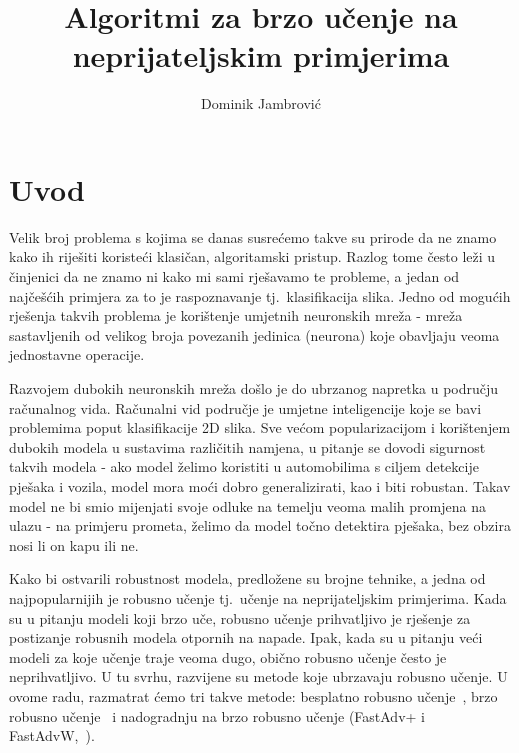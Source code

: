\documentclass[times, utf8, zavrsni, numeric]{fer}
\begin{document}

\title{Algoritmi za brzo učenje na neprijateljskim primjerima}

\author{Dominik Jambrović}

\maketitle

% 


\tableofcontents

\chapter{Uvod}
Velik broj problema s kojima se danas susrećemo takve su prirode da ne znamo kako ih riješiti koristeći klasičan, algoritamski pristup. Razlog tome često leži u činjenici da ne znamo ni kako mi sami rješavamo te probleme, 
a jedan od najčešćih primjera za to je raspoznavanje tj.\ klasifikacija slika.
Jedno od mogućih rješenja takvih problema je korištenje umjetnih neuronskih mreža - mreža sastavljenih od velikog broja povezanih jedinica (neurona) koje obavljaju veoma jednostavne operacije.

Razvojem dubokih neuronskih mreža došlo je do ubrzanog napretka u području računalnog vida. Računalni vid područje je umjetne inteligencije koje se bavi problemima poput klasifikacije 2D slika. 
Sve većom popularizacijom i korištenjem dubokih modela u sustavima različitih namjena, u pitanje se dovodi sigurnost takvih modela -
ako model želimo koristiti u automobilima s ciljem detekcije pješaka i vozila, model mora moći dobro generalizirati, kao i biti robustan. Takav model ne bi smio mijenjati svoje odluke na temelju veoma malih promjena na ulazu -
na primjeru prometa, želimo da model točno detektira pješaka, bez obzira nosi li on kapu ili ne.

Kako bi ostvarili robustnost modela, predložene su brojne tehnike, a jedna od najpopularnijih je robusno učenje tj.\ učenje na neprijateljskim primjerima. 
Kada su u pitanju modeli koji brzo uče, robusno učenje prihvatljivo je rješenje za postizanje robusnih modela otpornih na napade. 
Ipak, kada su u pitanju veći modeli za koje učenje traje veoma dugo, obično robusno učenje često je neprihvatljivo. 
U tu svrhu, razvijene su metode koje ubrzavaju robusno učenje. U ovome radu, razmatrat ćemo tri takve metode: besplatno robusno učenje~\cite{shafahi2019adversarial}, brzo robusno učenje~\cite{wong2020fast} i
nadogradnju na brzo robusno učenje (FastAdv+ i FastAdvW,~\cite{li2020towards}). 
\end{document}
